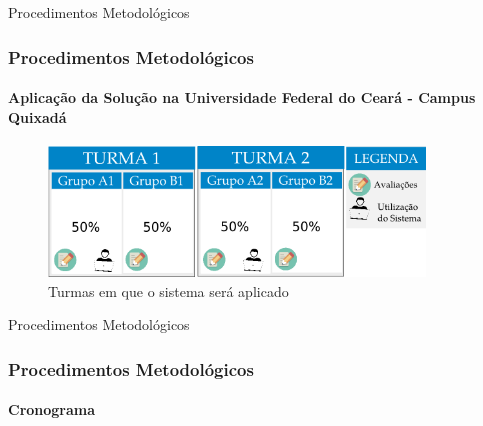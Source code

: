 \documentclass[aspectratio=169]{beamer}
\begin{document}

\setcounter{figure}{3}

\begin{frame}{Procedimentos Metodológicos}
\frametitle{Procedimentos Metodológicos}
\framesubtitle{Aplicação da Solução na Universidade Federal do Ceará - Campus Quixadá}

\begin{figure}[H]
\centering
\caption{Turmas em que o sistema ser\'a aplicado}
\includegraphics[width=10cm]{figuras/aplicacao.png}
\end{figure}

\end{frame}


\begin{frame}{Procedimentos Metodológicos}
\frametitle{Procedimentos Metodológicos}
\framesubtitle{Cronograma}
	
\end{frame}


\end{document}
